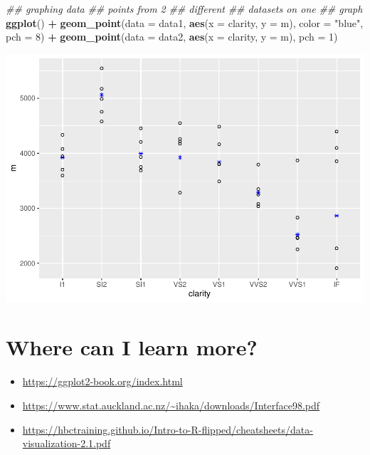\documentclass[
]{book}
\newenvironment{Shaded}{\begin{snugshade}}{\end{snugshade}}
\newcommand{\CommentTok}[1]{\textcolor[rgb]{0.56,0.35,0.01}{\textit{#1}}}
\newcommand{\DataTypeTok}[1]{\textcolor[rgb]{0.13,0.29,0.53}{#1}}
\newcommand{\DecValTok}[1]{\textcolor[rgb]{0.00,0.00,0.81}{#1}}
\newcommand{\KeywordTok}[1]{\textcolor[rgb]{0.13,0.29,0.53}{\textbf{#1}}}
\newcommand{\NormalTok}[1]{#1}
\newcommand{\OperatorTok}[1]{\textcolor[rgb]{0.81,0.36,0.00}{\textbf{#1}}}
\newcommand{\StringTok}[1]{\textcolor[rgb]{0.31,0.60,0.02}{#1}}
\begin{document}
\begin{Shaded}
\begin{Highlighting}[]
\CommentTok{## graphing data}
\CommentTok{## points from 2}
\CommentTok{## different}
\CommentTok{## datasets on one}
\CommentTok{## graph}
\KeywordTok{ggplot}\NormalTok{() }\OperatorTok{+}\StringTok{ }\KeywordTok{geom_point}\NormalTok{(}\DataTypeTok{data =}\NormalTok{ data1,}
    \KeywordTok{aes}\NormalTok{(}\DataTypeTok{x =}\NormalTok{ clarity,}
        \DataTypeTok{y =}\NormalTok{ m), }\DataTypeTok{color =} \StringTok{"blue"}\NormalTok{,}
    \DataTypeTok{pch =} \DecValTok{8}\NormalTok{) }\OperatorTok{+}\StringTok{ }\KeywordTok{geom_point}\NormalTok{(}\DataTypeTok{data =}\NormalTok{ data2,}
    \KeywordTok{aes}\NormalTok{(}\DataTypeTok{x =}\NormalTok{ clarity,}
        \DataTypeTok{y =}\NormalTok{ m), }\DataTypeTok{pch =} \DecValTok{1}\NormalTok{)}
\end{Highlighting}
\end{Shaded}

\includegraphics{_main_files/figure-latex/unnamed-chunk-256-8.pdf}

\hypertarget{where-can-i-learn-more}{%
\section{Where can I learn more?}\label{where-can-i-learn-more}}

\begin{itemize}
\item
  \url{https://ggplot2-book.org/index.html}
\item
  \url{https://www.stat.auckland.ac.nz/~ihaka/downloads/Interface98.pdf}
\item
  \url{https://hbctraining.github.io/Intro-to-R-flipped/cheatsheets/data-visualization-2.1.pdf}
\end{itemize}
\end{document}

